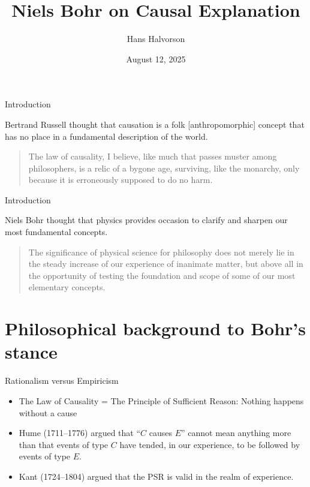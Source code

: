 \documentclass[fleqn]{beamer}
\title{Niels Bohr on Causal Explanation}
\subtitle{}
\author{Hans Halvorson}
\institute{Princeton University \& Niels Bohr Archive}
\date{August 12, 2025}
\begin{document}
\begin{frame}
   \titlepage
 \end{frame}

\begin{frame}{Introduction}

  Bertrand Russell thought that causation is a folk [anthropomorphic]
  concept that has no place in a fundamental description of the world.

  \medskip \begin{quote} The law of causality, I believe, like much
    that passes muster among philosophers, is a relic of a bygone age,
    surviving, like the monarchy, only because it is erroneously
    supposed to do no harm. \citep[p 12]{russell1913} \end{quote}
    
\end{frame}

\begin{frame}{Introduction}

  Niels Bohr thought that physics provides occasion to clarify and
  sharpen our most fundamental concepts.

  \medskip \begin{quote} The significance of physical science for
    philosophy does not merely lie in the steady increase of our
    experience of inanimate matter, but above all in the opportunity
    of testing the foundation and scope of some of our most elementary
    concepts. \citep[p 308]{qphil1958} \end{quote}


\end{frame}

\section{Philosophical background to Bohr's stance}

\begin{frame}{Rationalism versus Empiricism}

  \begin{itemize}
  \item The Law of Causality = The Principle of Sufficient Reason:
    Nothing happens without a cause 
  \item Hume (1711--1776) argued that ``$C$ causes $E$'' cannot mean
    anything more than that events of type $C$ have tended, in our
    experience, to be followed by events of type $E$.
  \item Kant (1724--1804) argued that the PSR is valid in the realm of
    experience.
  \end{itemize}

\end{frame}
\end{document}
